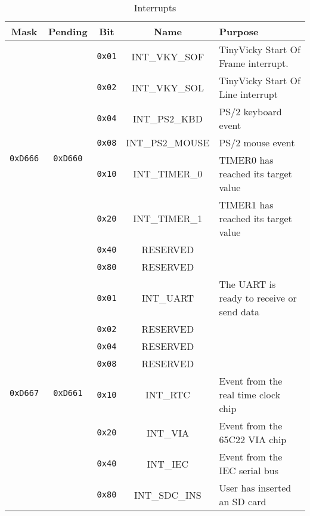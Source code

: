 \begin{table}[ht]
	\begin{center}
		\begin{tabular}{| c | c | c | c | l |} \hline
            Mask & Pending & Bit & Name & Purpose \\ \hline\hline

            \multirow{8}{*}{{\tt 0xD666}} & \multirow{8}{*}{{\tt 0xD660}} & \verb+0x01+ & INT\_VKY\_SOF & TinyVicky Start Of Frame interrupt. \\ \cline{3-5}

            & & \verb+0x02+ & INT\_VKY\_SOL & TinyVicky Start Of Line interrupt \\ \cline{3-5}

            & & \verb+0x04+ & INT\_PS2\_KBD & PS/2 keyboard event \\ \cline{3-5}

            & & \verb+0x08+ & INT\_PS2\_MOUSE & PS/2 mouse event \\ \cline{3-5}

            & & \verb+0x10+ & INT\_TIMER\_0 & TIMER0 has reached its target value \\ \cline{3-5}

            & & \verb+0x20+ & INT\_TIMER\_1 & TIMER1 has reached its target value \\ \cline{3-5}

            & & \verb+0x40+ & RESERVED & \\ \cline{3-5}

            & & \verb+0x80+ & RESERVED & \\ \hline

            \multirow{8}{*}{{\tt 0xD667}} & \multirow{8}{*}{{\tt 0xD661}} & \verb+0x01+ & INT\_UART & The UART is ready to receive or send data \\ \cline{3-5}

            & & \verb+0x02+ & RESERVED & \\ \cline{3-5}

            & & \verb+0x04+ & RESERVED & \\ \cline{3-5}

            & & \verb+0x08+ & RESERVED & \\ \cline{3-5}

            & & \verb+0x10+ & INT\_RTC & Event from the real time clock chip \\ \cline{3-5}

            & & \verb+0x20+ & INT\_VIA & Event from the 65C22 VIA chip \\ \cline{3-5}

            & & \verb+0x40+ & INT\_IEC & Event from the IEC serial bus \\ \cline{3-5}

            & & \verb+0x80+ & INT\_SDC\_INS & User has inserted an SD card \\ \hline
        \end{tabular}
    \end{center}
	\caption{Interrupts}
	\label{tab:interrupts}
\end{table}

